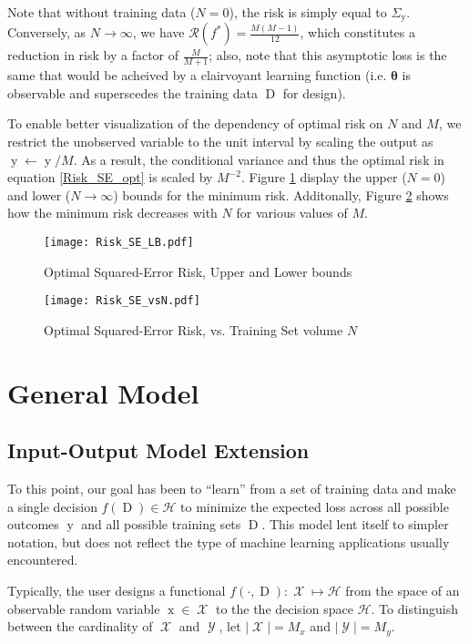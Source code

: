\documentclass[12pt]{report}
\DeclareMathOperator{\xrm}{\mathrm{x}}
\DeclareMathOperator{\yrm}{\mathrm{y}}
\DeclareMathOperator{\Drm}{\mathrm{D}}
\DeclareMathOperator{\Xcal}{\mathcal{X}}
\DeclareMathOperator{\Ycal}{\mathcal{Y}}
\begin{document}
Note that without training data ($N=0$), the risk is simply equal to $\Sigma_{\yrm}$. Conversely, as $N \to \infty$, we have $\mathcal{R}(f^*) = \frac{M(M-1)}{12}$, which constitutes a reduction in risk by a factor of $\frac{M}{M+1}$; also, note that this asymptotic loss is the same that would be acheived by a clairvoyant learning function (i.e. $\bm{\theta}$ is observable and superscedes the training data $\Drm$ for design).

To enable better visualization of the dependency of optimal risk on $N$ and $M$, we restrict the unobserved variable to the unit interval by scaling the output as $\yrm \gets \yrm/M$. As a result, the conditional variance and thus the optimal risk in equation \eqref{Risk_SE_opt} is scaled by $M^{-2}$. Figure \ref{fig:Risk_SE_LB} display the upper ($N=0$) and lower ($N \to \infty$) bounds for the minimum risk. Additonally, Figure \ref{fig:Risk_SE_vsN} shows how the minimum risk decreases with $N$ for various values of $M$.


\begin{figure}
\centering
\texttt{[image: Risk\_SE\_LB.pdf]}
\caption{Optimal Squared-Error Risk, Upper and Lower bounds}
\label{fig:Risk_SE_LB}
\end{figure}

\begin{figure}
\centering
\texttt{[image: Risk\_SE\_vsN.pdf]}
\caption{Optimal Squared-Error Risk, vs. Training Set volume $N$}
\label{fig:Risk_SE_vsN}
\end{figure}




\section{General Model}

\subsection{Input-Output Model Extension}

To this point, our goal has been to ``learn'' from a set of training data and make a single decision $f(\Drm) \in \mathcal{H}$ to minimize the expected loss across all possible outcomes $\yrm$ and all possible training sets $\Drm$. This model lent itself to simpler notation, but does not reflect the type of machine learning applications usually encountered. 

Typically, the user designs a functional $f(\cdot,\Drm): \Xcal \mapsto \mathcal{H}$ from the space of an observable random variable $\xrm \in \Xcal$ to the the decision space $\mathcal{H}$. To distinguish between the cardinality of $\Xcal$ and $\Ycal$, let $|\Xcal| = M_x$ and $|\Ycal| = M_y$.
\end{document}
